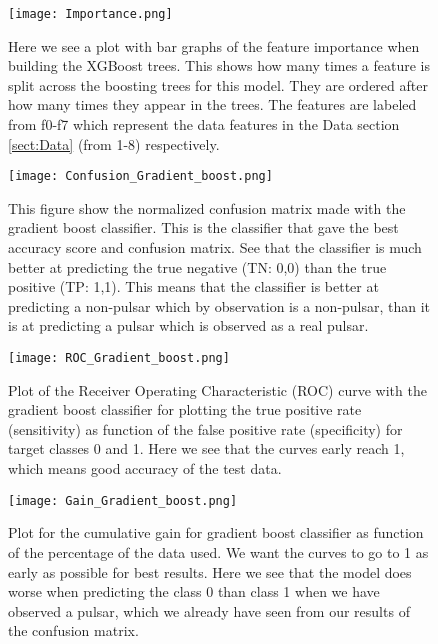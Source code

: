 \documentclass[12pt,a4paper,english]{article}
\begin{document}
\begin{figure}[htbp!]
	\centering\texttt{[image: Importance.png]}
	\caption{Here we see a plot with bar graphs of the feature importance when building the XGBoost trees. This shows how many times a feature is split across the boosting trees for this model. They are ordered after how many times they appear in the trees. The features are labeled from f0-f7 which represent the data features in the Data section \ref{sect:Data} (from 1-8) respectively. \label{fig:importance}}
\end{figure}

\begin{figure}[htbp!]
	\centering\texttt{[image: Confusion\_Gradient\_boost.png]}
	\caption{This figure show the normalized confusion matrix made with the gradient boost classifier. This is the classifier that gave the best accuracy score and confusion matrix. See that the classifier is much better at predicting the true negative (TN: 0,0) than the true positive (TP: 1,1). This means that the classifier is better at predicting a non-pulsar which by observation is a non-pulsar, than it is at predicting a pulsar which is observed as a real pulsar.  \label{fig:confusion}}
\end{figure}

\begin{figure}[htbp!]
	\centering\texttt{[image: ROC\_Gradient\_boost.png]}
	\caption{Plot of the Receiver Operating Characteristic (ROC) curve with the gradient boost classifier for plotting the true positive rate (sensitivity) as function of the false positive rate (specificity) for target classes 0 and 1. Here we see that the curves early reach 1, which means good accuracy of the test data. \label{fig:ROC}}
\end{figure}

\begin{figure}[htbp!]
	\centering\texttt{[image: Gain\_Gradient\_boost.png]}
	\caption{Plot for the cumulative gain for gradient boost classifier as function of the percentage of the data used. We want the curves to go to 1 as early as possible for best results. Here we see that the model does worse when predicting the class 0 than class 1 when we have observed a pulsar, which we already have seen from our results of the confusion matrix. \label{fig:cumulative_gain}}
\end{figure}

\newpage
\end{document}
